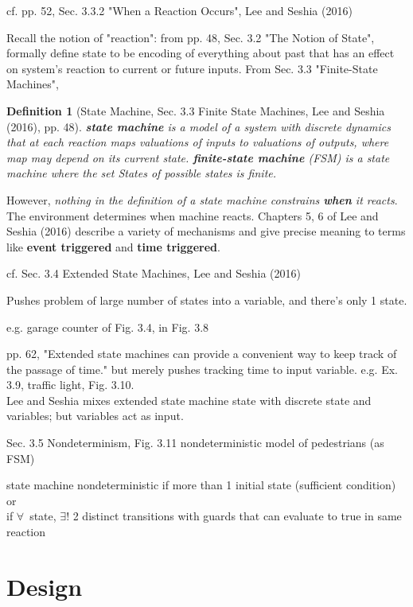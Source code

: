 \documentclass[10pt]{amsart}
\newtheorem{definition}{Definition}
\begin{document}
\begin{multicols*}{2}
cf. pp. 52, Sec. 3.3.2 "When a Reaction Occurs", Lee and Seshia (2016) \cite{LeSe2016}

Recall the notion of "reaction": from pp. 48, Sec. 3.2 "The Notion of State", formally define state to be encoding of everything about past that has an effect on system's reaction to current or future inputs. From Sec. 3.3 "Finite-State Machines", 
\begin{definition}[State Machine, Sec. 3.3 Finite State Machines, Lee and Seshia (2016)\cite{LeSe2016}, pp. 48]
	\textbf{state machine} is a model of a system with discrete dynamics that at each \emph{reaction} maps valuations of inputs to valuations of outputs, where map may depend on its current state.
	\textbf{finite-state machine} (FSM) is a state machine where the set \emph{States} of possible states is finite.
\end{definition}

However, \emph{nothing in the definition of a state machine constrains \textbf{when} it reacts}. The environment determines when machine reacts. Chapters 5, 6 of Lee and Seshia (2016) \cite{LeSe2016} describe a variety of mechanisms and give precise meaning to terms like \textbf{event triggered} and \textbf{time triggered}.

cf. Sec. 3.4 Extended State Machines, Lee and Seshia (2016) \cite{LeSe2016}

Pushes problem of large number of states into a variable, and there's only 1 state.

e.g. garage counter of Fig. 3.4, in Fig. 3.8

pp. 62, "Extended state machines can provide a convenient way to keep track of the passage of time." but merely pushes tracking time to input variable. e.g. Ex. 3.9, traffic light, Fig. 3.10. \\

Lee and Seshia mixes extended state machine state with discrete state and variables; but variables act as input.

Sec. 3.5 Nondeterminism, Fig. 3.11 nondeterministic model of pedestrians (as FSM)

state machine nondeterministic if more than 1 initial state (sufficient condition) or \\
if $\forall \,$ state, $\exists !$ 2 distinct transitions with guards that can evaluate to true in same reaction \\

\part{Design}


\end{multicols*}
\end{document}
